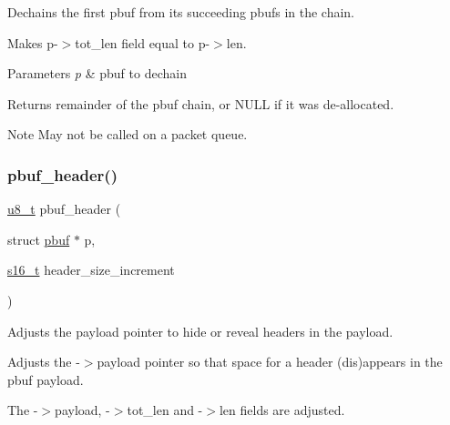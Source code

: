 Dechains the first pbuf from its succeeding pbufs in the chain.

Makes p-\/$>$tot\+\_\+len field equal to p-\/$>$len. 
\begin{DoxyParams}{Parameters}
{\em p} & pbuf to dechain \\
\hline
\end{DoxyParams}
\begin{DoxyReturn}{Returns}
remainder of the pbuf chain, or N\+U\+LL if it was de-\/allocated. 
\end{DoxyReturn}
\begin{DoxyNote}{Note}
May not be called on a packet queue. 
\end{DoxyNote}
\mbox{\label{openmote-cc2538_2lwip_2src_2include_2lwip_2pbuf_8h_aaa17c1951cf2d207b6adfd3947d91f00}} 
\subsubsection{\texorpdfstring{pbuf\+\_\+header()}{pbuf\_header()}}
{\footnotesize\ttfamily \hyperlink{group__compiler__abstraction_ga4caecabca98b43919dd11be1c0d4cd8e}{u8\+\_\+t} pbuf\+\_\+header (\begin{DoxyParamCaption}\item[{struct \hyperlink{structpbuf}{pbuf} $\ast$}]{p,  }\item[{\hyperlink{group__compiler__abstraction_gacf46f4df0ebab84edebcb69967fdf86b}{s16\+\_\+t}}]{header\+\_\+size\+\_\+increment }\end{DoxyParamCaption})}

Adjusts the payload pointer to hide or reveal headers in the payload.

Adjusts the -\/$>$payload pointer so that space for a header (dis)appears in the pbuf payload.

The -\/$>$payload, -\/$>$tot\+\_\+len and -\/$>$len fields are adjusted.


